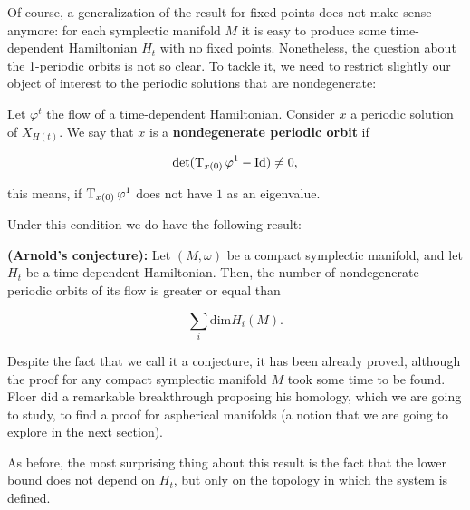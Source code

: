 Of course, a generalization of the result for fixed points does not make sense anymore: for each symplectic manifold $M$ it is easy to produce some time-dependent Hamiltonian $H_t$ with no fixed points. Nonetheless, the question about the 1-periodic orbits is not so clear. To tackle it, we need to restrict slightly our object of interest to the periodic solutions that are nondegenerate:

\begin{deff}
Let $\varphi^t$ the flow of a time-dependent Hamiltonian. Consider $x$ a periodic solution of $X_{H(t)}$. We say that $x$ is a {\bf nondegenerate periodic orbit} if

$$\text{det}(\operatorname T_{x(0)} \varphi^1 - \text{Id}) \neq 0 ,$$

this means, if $\operatorname T_{x(0)} \varphi^1$ does not have $1$ as an eigenvalue.
\end{deff}

Under this condition we do have the following result:

\begin{theo}
{\bf (Arnold's conjecture):} Let $(M,\omega)$ be a compact symplectic manifold, and let $H_t$ be a time-dependent Hamiltonian. Then, the number of nondegenerate periodic orbits of its flow is greater or equal than

$$\sum_i \text{dim}H_i(M) .$$
\end{theo}

Despite the fact that we call it a conjecture, it has been already proved, although the proof for any compact symplectic manifold $M$ took some time to be found. Floer did a remarkable breakthrough proposing his homology, which we are going to study, to find a proof for aspherical manifolds (a notion that we are going to explore in the next section).

As before, the most surprising thing about this result is the fact that the lower bound does not depend on $H_t$, but only on the topology in which the system is defined.
